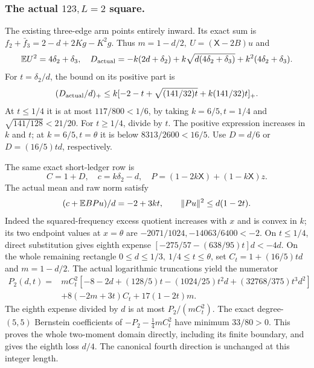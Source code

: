 \subsubsection{The actual \(123,L=2\) square.}\label{part:unit-p:exchanged123}
The existing three-edge arm points entirely inward.
Its exact sum is \(f_2+\bar f_3=2-d+2Kg-K^2g\).
Thus \(m=1-d/2,\ U=(\mathsf X-2B)u\) and
\[
 \mathbb E U^2=4\delta_2+\delta_3,\quad
 D_{\rm actual}=-k(2d+\delta_2)+k\sqrt{d(4\delta_2+\delta_3)}
                                  +k^2(4\delta_2+\delta_3).
\]
For \(t=\delta_2/d\), the bound on its positive part is
\[
 (D_{\rm actual}/d)_+
 \le k[-2-t+\sqrt{(141/32)t}+k(141/32)t]_+ .
\]
At \(t\le1/4\) it is at most \(117/800<1/6\), by taking
\(k=6/5,t=1/4\) and \(\sqrt{141/128}<21/20\).
For \(t\ge1/4\), divide by \(t\). The positive expression
increases in \(k\) and \(t\); at \(k=6/5,t=\theta\) it is
below \(8313/2600<16/5\).
Use \(D=d/6\) or \(D=(16/5)td\), respectively.

The same exact short-ledger row is
\[
 C=1+D,\quad c=k\delta_2-d,\quad
 P=(1-2k\mathsf X)+(1-k\mathsf X)z .
\]
The actual mean and raw norm satisfy
\[
 (c+\mathbb E BPu)/d=-2+3kt,\qquad \|Pu\|^2\le d(1-2t).
\]
Indeed the squared-frequency excess quotient increases with \(x\)
and is convex in \(k\); its two endpoint values at \(x=\theta\)
are \(-2071/1024,-14063/6400<-2\).
On \(t\le1/4\), direct substitution gives eighth expense
\([-275/57-(638/95)t]d<-4d\).
On the whole remaining rectangle
\(0\le d\le1/3,\ 1/4\le t\le\theta\), set
\(C_t=1+(16/5)td\) and \(m=1-d/2\).
The actual logarithmic truncations yield the numerator
\begin{equation}\label{eq:unit-p:data-32}
\begin{aligned}
 P_2(d,t)={}&mC_t^2[-8-2d+(128/5)t-(1024/25)t^2d
                                   +(32768/375)t^3d^2]\\
 &+8(-2m+3t)C_t+17(1-2t)m .
\end{aligned}
\end{equation}
The eighth expense divided by \(d\) is at most
\(P_2/(mC_t^2)\).
The exact degree-\((5,5)\) Bernstein coefficients of
\(-P_2-\tfrac14mC_t^2\) have minimum \(33/80>0\).
This proves the whole two-moment domain directly, including
its finite boundary, and gives the eighth loss \(d/4\).
The canonical fourth direction is unchanged at this integer length.

